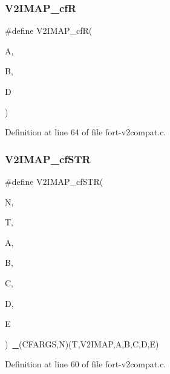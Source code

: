 \subsubsection{\texorpdfstring{V2\+I\+M\+A\+P\+\_\+cfR}{V2IMAP\_cfR}}
{\footnotesize\ttfamily \#define V2\+I\+M\+A\+P\+\_\+cfR(\begin{DoxyParamCaption}\item[{}]{A,  }\item[{}]{B,  }\item[{}]{D }\end{DoxyParamCaption})}



Definition at line 64 of file fort-\/v2compat.\+c.

\mbox{\label{fort-v2compat_8c_a630377bcd05264463957043895a222be}} 
\subsubsection{\texorpdfstring{V2\+I\+M\+A\+P\+\_\+cf\+S\+TR}{V2IMAP\_cfSTR}}
{\footnotesize\ttfamily \#define V2\+I\+M\+A\+P\+\_\+cf\+S\+TR(\begin{DoxyParamCaption}\item[{}]{N,  }\item[{}]{T,  }\item[{}]{A,  }\item[{}]{B,  }\item[{}]{C,  }\item[{}]{D,  }\item[{}]{E }\end{DoxyParamCaption})~\hyperlink{cfortran_8h_ae5cd5aa262ffbc853d773293d00e4323}{\+\_\+}(C\+F\+A\+R\+GS,N)(T,V2\+I\+M\+AP,A,B,C,D,E)}



Definition at line 60 of file fort-\/v2compat.\+c.

\mbox{\label{fort-v2compat_8c_af30c5da58198e42fb61f784fc3ddfb3b}} 
